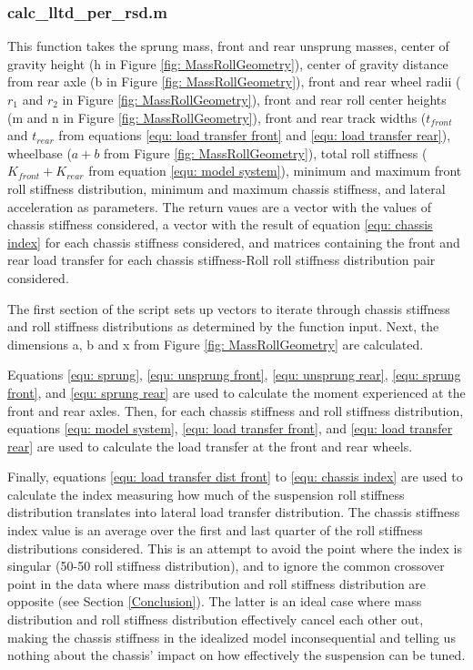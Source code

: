 \documentclass[a4paper]{article}
\numberwithin{equation}{section}
\begin{document}
\subsubsection{calc\_lltd\_per\_rsd.m} \label{calc_lltd_per_rsd.m}
This function takes the sprung mass, front and rear unsprung masses, center of gravity height (h in Figure \ref{fig: MassRollGeometry}), center of gravity distance from rear axle (b in Figure \ref{fig: MassRollGeometry}), front and rear wheel radii ($r_1$ and $r_2$ in Figure \ref{fig: MassRollGeometry}), front and rear roll center heights (m and n in Figure \ref{fig: MassRollGeometry}), front and rear track widths ($t_{front}$ and $t_{rear}$ from equations \ref{equ: load transfer front} and \ref{equ: load transfer rear}), wheelbase ($a+b$ from Figure \ref{fig: MassRollGeometry}), total roll stiffness ($K_{front} + K_{rear}$ from equation \ref{equ: model system}), minimum and maximum front roll stiffness distribution, minimum and maximum chassis stiffness, and lateral acceleration as parameters. The return vaues are a vector with the values of chassis stiffness considered, a vector with the result of equation \ref{equ: chassis index} for each chassis stiffness considered, and matrices containing the front and rear load transfer for each chassis stiffness-Roll roll stiffness distribution pair considered.

The first section of the script sets up vectors to iterate through chassis stiffness and roll stiffness distributions as determined by the function input. Next, the dimensions a, b and x from Figure \ref{fig: MassRollGeometry} are calculated.

Equations \ref{equ: sprung}, \ref{equ: unsprung front}, \ref{equ: unsprung rear}, \ref{equ: sprung front}, and \ref{equ: sprung rear} are used to calculate the moment experienced at the front and rear axles. Then, for each chassis stiffness and roll stiffness distribution, equations \ref{equ: model system}, \ref{equ: load transfer front}, and \ref{equ: load transfer rear} are used to calculate the load transfer at the front and rear wheels.

Finally, equations \ref{equ: load transfer dist front} to \ref{equ: chassis index} are used to calculate the index measuring how much of the suspension roll stiffness distribution translates into lateral load transfer distribution. The chassis stiffness index value is an average over the first and last quarter of the roll stiffness distributions considered. This is an attempt to avoid the point where the index is singular (50-50 roll stiffness distribution), and to ignore the common crossover point in the data where mass distribution and roll stiffness distribution are opposite (see Section \ref{Conclusion}). The latter is an ideal case where mass distribution and roll stiffness distribution effectively cancel each other out, making the chassis stiffness in the idealized model inconsequential and telling us nothing about the chassis' impact on how effectively the suspension can be tuned.
\end{document}
